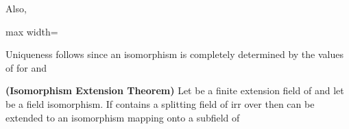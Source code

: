 \documentclass[11pt,oneside]{article}
\begin{document}
\begin{BookBody}
Also,

\begin{center}\begin{adjustbox}{max width=\linewidth}\end{adjustbox}\end{center}

Uniqueness follows since an isomorphism  is completely determined by the values of  for  and \BookEnd{\blacklozenge}

 \textbf{(Isomorphism Extension Theorem)} Let  be a finite extension field of  and let  be a field isomorphism. If  contains a splitting field of irr over  then \BookInline{\sigma } can be extended to an isomorphism \BookInline{\tau } mapping  onto a subfield of 

\end{BookBody}

\BookNarrativetrue
\end{document}
